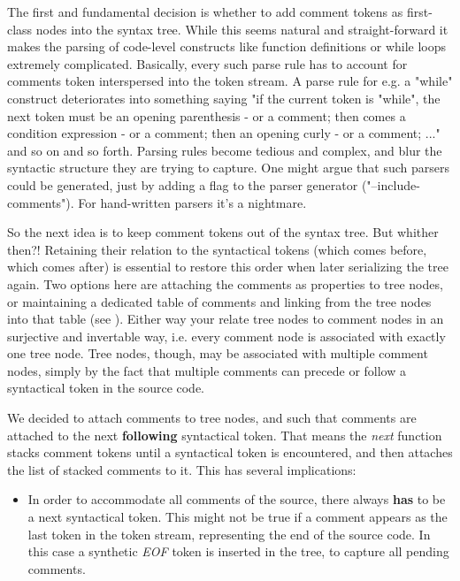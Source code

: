 \documentclass[11pt,a4paper]{article}
\begin{document}
The first and fundamental decision is whether to add comment tokens as
first-class nodes into the syntax tree. While this seems natural and
straight-forward it makes the parsing of code-level constructs like function
definitions or while loops extremely complicated. Basically, every such parse
rule has to account for comments token interspersed into the token stream. A
parse rule for e.g. a "while" construct deteriorates into something saying "if
the current token is "while", the next token must be an opening parenthesis - or
a comment; then comes a condition expression - or a comment; then an opening
curly - or a comment; ..." and so on and so forth. Parsing rules become tedious
and complex, and blur the syntactic structure they are trying to capture. One
might argue that such parsers could be generated, just by adding a flag to the
parser generator ("--include-comments"). For hand-written parsers it's a
nightmare.

So the next idea is to keep comment tokens out of the syntax tree. But whither
then?! Retaining their relation to the syntactical tokens (which comes before,
which comes after) is essential to restore this order when later serializing the
tree again. Two options here are attaching the comments as properties to tree
nodes, or maintaining a dedicated table of comments and linking from the tree
nodes into that table (see \cite{bartho-2009}). Either way your relate tree nodes to comment nodes in an
surjective and invertable way, i.e. every comment node is associated with
exactly one tree node. Tree nodes, though, may be associated with multiple
comment nodes, simply by the fact that multiple comments can precede or follow a
syntactical token in the source code.

We decided to attach comments to tree nodes, and such that comments are attached
to the next \textbf{following} syntactical token. That means the \textit{next}
function stacks comment tokens until a syntactical token is encountered,
and then attaches the list of stacked comments to it. This has several implications:

\begin{itemize}
\item In order to accommodate all comments of the source, there always
  \textbf{has} to be a next syntactical token. This might not be true if a
  comment appears as the last token in the token stream, representing the end of
  the source code. In this case a synthetic \textit{EOF} token is inserted in
  the tree, to capture all pending comments.
\end{itemize}
\end{document}
